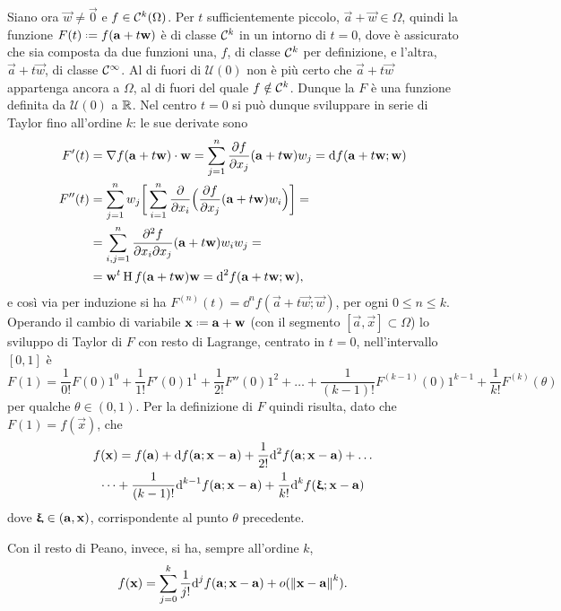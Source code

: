 Siano ora $\vec w\neq\vec 0$ e $f\in\mathcal{C}^{{k}}(\Omega)$. Per $t$ sufficientemente piccolo, $\vec a+\vec w\in\Omega$, quindi la funzione $F(t)\defeq f(\vec a+t\vec w)$ è di classe $\mathcal{C}^{{k}}$ in un intorno di $t=0$, dove è assicurato che sia composta da due funzioni una, $f$, di classe $\mathcal{C}^{{k}}$ per definizione, e l'altra, $\vec a+t\vec w$, di classe $\mathcal{C}^{{\infty}}$. Al di fuori di $\mathcal U(0)$ non è più certo che $\vec a+t\vec w$ appartenga ancora a $\Omega$, al di fuori del quale $f\notin\mathcal{C}^{{k}}$. Dunque la $F$ è una funzione definita da $\mathcal U(0)$ a $\mathbb{R}$. Nel centro $t=0$ si può dunque sviluppare in serie di Taylor fino all'ordine $k$: le sue derivate sono
\begin{equation}\begin{aligned}
F'(t)	&={\nabla f(\mathbf{a}+t\mathbf{w})}\cdot{\mathbf{w}}=\sum_{j=1}^n\frac{\partial {f}}{\partial {x_j}}(\mathbf{a}+t\mathbf{w})w_j=\textup{d} f(\mathbf{a}+t\mathbf{w};\mathbf{w})\\
F''(t)	&=\sum_{j=1}^nw_j\bigg[\sum_{i=1}^n\frac{\partial {}}{\partial {x_i}}\Big(\frac{\partial {f}}{\partial {x_j}}(\mathbf{a}+t\mathbf{w})w_i\Big)\bigg]=\\
		&=\sum_{i,j=1}^n\frac{\partial^2f}{\partial x_i\partial x_j}(\mathbf{a}+t\mathbf{w})w_iw_j=\\
		&=\mathbf{w}^t\operatorname{H} f(\mathbf{a}+t\mathbf{w})\mathbf{w}=\textup{d}^2f(\mathbf{a}+t\mathbf{w};\mathbf{w}),
\end{aligned}\end{equation}
e così via per induzione %
si ha $F^{(n)}(t)=\dd^nf(\vec a+t\vec w;\vec w)$, per ogni $0\leq n\leq k$.
Operando il cambio di variabile $\vec x\defeq\vec a+\vec w$ (con il segmento $[\vec a,\vec x]\subset\Omega$) lo sviluppo di Taylor di $F$ con resto di Lagrange, centrato in $t=0$, nell'intervallo $[0,1]$ è
\[
F(1)=\frac1{0!}F(0)1^0+\frac1{1!}F'(0)1^1+\frac1{2!}F''(0)1^2+\dots+\frac1{(k-1)!}F^{(k-1)}(0)1^{k-1}+\frac1{k!}F^{(k)}(\theta)
\]
per qualche $\theta\in(0,1)$. Per la definizione di $F$ quindi risulta, dato che $F(1)=f(\vec x)$, che
\begin{multline} \label{eq:formula_taylor_lagrange_piu_variabili}
f(\mathbf{x})=f(\mathbf{a})+\textup{d} f(\mathbf{a};\mathbf{x}-\mathbf{a})+\frac1{2!}\textup{d}^2f(\mathbf{a};\mathbf{x}-\mathbf{a})+\dots\\
\dots+\frac1{(k-1)!}\textup{d}^{k-1}f(\mathbf{a};\mathbf{x}-\mathbf{a})+\frac1{k!}\textup{d}^kf(\bm{\upxi};\mathbf{x}-\mathbf{a})
\end{multline}
dove $\bm{\upxi}\in(\mathbf{a},\mathbf{x})$, corrispondente al punto $\theta$ precedente.

Con il resto di Peano, invece, si ha, sempre all'ordine $k$,
\begin{equation} \label{eq:formula_taylor_peano_piu_variabili}
f(\mathbf{x})=\sum_{j=0}^k\frac1{j!}\textup{d}^jf(\mathbf{a};\mathbf{x}-\mathbf{a})+o(\left\|{\mathbf{x}-\mathbf{a}}\right\|^k).
\end{equation}

